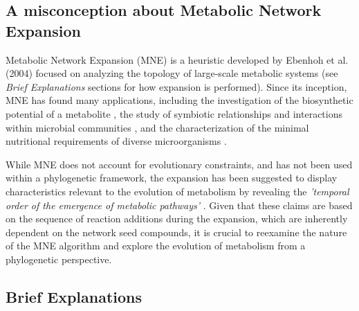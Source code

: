 \subsection*{A misconception about Metabolic Network Expansion}

Metabolic Network Expansion (MNE) is a heuristic developed by Ebenhoh et al. (2004) \cite{ebenhoh2004} focused on analyzing the topology of large-scale metabolic systems (see \textit{Brief Explanations} sections for how expansion is performed). Since its inception, MNE has found many applications, including the investigation of the biosynthetic potential of a metabolite \cite{handorf2005, ebenhoh2006a}, the study of symbiotic relationships and interactions within microbial communities \cite{christian2007, frioux2018}, and the characterization of the minimal nutritional requirements of diverse microorganisms \cite{handorf2008,borenstein2008}.

While MNE does not account for evolutionary constraints, and has not been used within a phylogenetic framework, the expansion has been suggested to display characteristics relevant to the evolution of metabolism \cite{handorf2005, ebenhoh2006a, kreimer2008} by revealing the \textit{'temporal order of the emergence of metabolic pathways'} \cite{handorf2005}. Given that these claims are based on the sequence of reaction additions during the expansion, which are inherently dependent on the network seed compounds, it is crucial to reexamine the nature of the MNE algorithm and explore the evolution of metabolism from a phylogenetic perspective.


\subsection*{Brief Explanations}


